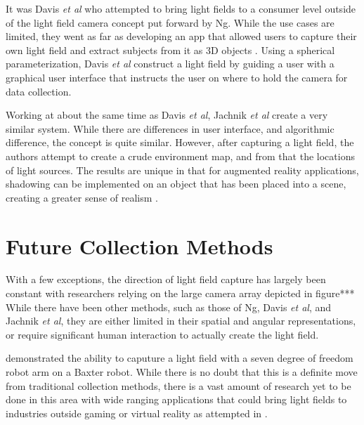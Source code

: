 \documentclass[12pt]{report}
\begin{document}
It was Davis \emph{et al} who attempted to bring light fields to a consumer level outside of the light field camera concept put forward by Ng. While the use cases are limited, they went as far as developing an app that allowed users to capture their own light field and extract subjects from it as 3D objects \cite{Davis12}. Using a spherical parameterization, Davis \emph{et al} construct a light field by guiding a user with a graphical user interface that instructs the user on where to hold the camera for data collection.

Working at about the same time as Davis \emph{et al}, Jachnik \emph{et al} create a very similar system. While there are differences in user interface, and algorithmic difference, the concept is quite similar. However, after capturing a light field, the authors attempt to create a crude environment map, and from that the locations of light sources. The results are unique in that for augmented reality applications, shadowing can be implemented on an object that has been placed into a scene, creating a greater sense of realism \cite{Jachnik13}.

\section*{Future Collection Methods}
With a few exceptions, the direction of light field capture has largely been constant with researchers relying on the large camera array depicted in figure*** While there have been other methods, such as those of Ng, Davis \emph{et al}, and Jachnik \emph{et al}, they are either limited in their spatial and angular representations, or require significant human interaction to actually create the light field.

 \cite{Oberlin16} demonstrated the ability to caputure a light field with a seven degree of freedom robot arm on a Baxter robot. While there is no doubt that this is a definite move from traditional collection methods, there is a vast amount of research yet to be done in this area with wide ranging applications that could bring light fields to industries outside gaming or virtual reality as attempted in \cite{Levoy06b}.
\end{document}
